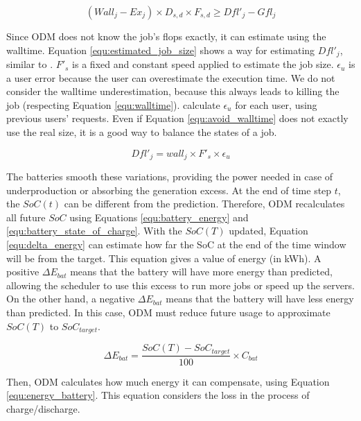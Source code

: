 \begin{equation}
    (Wall_j - Ex_j) \times D_{s,d} \times F_{s,d} \ge Dfl'_j - Gfl_j
    \label{equ:avoid_walltime}
\end{equation}

Since ODM does not know the job's flops exactly, it can estimate using the walltime. Equation \ref{equ:estimated_job_size} shows a way for estimating $Dfl'_j$, similar to \cite{takizawa2020effect}. $F'_{s}$ is a fixed and constant speed applied to estimate the job size. $\epsilon_{u}$ is a user error because the user can overestimate the execution time. We do not consider the walltime underestimation, because this always leads to killing the job (respecting Equation \ref{equ:walltime}). \citeauthor{takizawa2020effect} calculate $\epsilon_{u}$ for each user, using previous users' requests. Even if Equation \ref{equ:avoid_walltime} does not exactly use the real size, it is a good way to balance the states of a job.

\begin{equation}
    \label{equ:estimated_job_size}
    Dfl'_j = wall_j \times F'_{s} \times \epsilon_{u}
\end{equation}

The batteries smooth these variations, providing the power needed in case of underproduction or absorbing the generation excess. At the end of time step $t$, the $SoC(t)$ can be different from the prediction. Therefore, ODM recalculates all future $SoC$ using Equations \ref{equ:battery_energy} and \ref{equ:battery_state_of_charge}. With the $SoC(T)$ updated, Equation \ref{equ:delta_energy} can estimate how far the SoC at the end of the time window will be from the target. This equation gives a value of energy (in kWh). A positive $\Delta E_{bat}$ means that the battery will have more energy than predicted, allowing the scheduler to use this excess to run more jobs or speed up the servers. On the other hand, a negative $\Delta E_{bat}$ means that the battery will have less energy than predicted. In this case, ODM must reduce future usage to approximate $SoC(T)$ to $SoC_{target}$.

\begin{equation}
    \label{equ:delta_energy}
    \Delta E_{bat} = \frac{SoC(T) - SoC_{target}}{100}\times C_{bat}
\end{equation}

Then, ODM calculates how much energy it can compensate, using Equation \ref{equ:energy_battery}. This equation considers the loss in the process of charge/discharge. 

